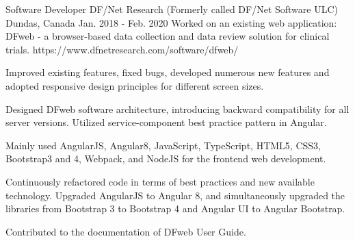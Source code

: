 

\begin{cventries}

  \cventry
{Software Developer} %
{DF/Net Research (Formerly called DF/Net Software ULC)} %
{Dundas, Canada} %
{Jan. 2018 - Feb. 2020} %
{Worked on an existing web application: DFweb -  a browser-based data collection and data review solution for clinical trials. https://www.dfnetresearch.com/software/dfweb/}
	{\begin{cvitems}
		\item
		{Improved existing features, fixed bugs, developed numerous new features and adopted responsive design principles for different screen sizes.}
		\item
		{Designed DFweb software architecture, introducing backward compatibility for all server versions. Utilized service-component best practice pattern in Angular.}
		\item
		{Mainly used AngularJS, Angular8, JavaScript, TypeScript, HTML5, CSS3, Bootstrap3 and 4, Webpack, and NodeJS for the frontend web development.}
		\item
		{Continuously refactored code in terms of best practices and new available technology. Upgraded AngularJS to Angular 8, and simultaneously upgraded the libraries from Bootstrap 3 to Bootstrap 4 and Angular UI to Angular Bootstrap. }
		\item
		{Contributed to the documentation of DFweb User Guide.}
	\end{cvitems}
}
	


\end{cventries}

